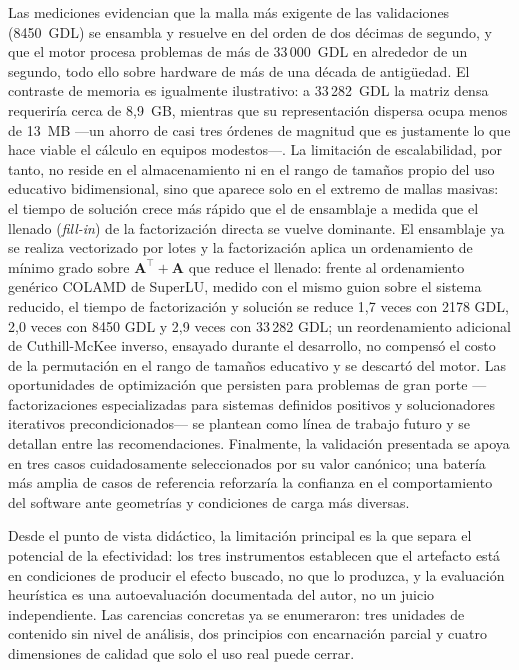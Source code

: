 Las mediciones evidencian que la malla más exigente de las validaciones (8450~GDL) se ensambla y resuelve en del orden de dos décimas de segundo, y que el motor procesa problemas de más de 33\,000~GDL en alrededor de un segundo, todo ello sobre hardware de más de una década de antigüedad. El contraste de memoria es igualmente ilustrativo: a 33\,282~GDL la matriz densa requeriría cerca de 8{,}9~GB, mientras que su representación dispersa ocupa menos de 13~MB ---un ahorro de casi tres órdenes de magnitud que es justamente lo que hace viable el cálculo en equipos modestos---. La limitación de escalabilidad, por tanto, no reside en el almacenamiento ni en el rango de tamaños propio del uso educativo bidimensional, sino que aparece solo en el extremo de mallas masivas: el tiempo de solución crece más rápido que el de ensamblaje a medida que el llenado (\emph{fill-in}) de la factorización directa se vuelve dominante. El ensamblaje ya se realiza vectorizado por lotes y la factorización aplica un ordenamiento de mínimo grado sobre $\bm{A}^{\top}+\bm{A}$ que reduce el llenado: frente al ordenamiento genérico COLAMD de SuperLU, medido con el mismo guion sobre el sistema reducido, el tiempo de factorización y solución se reduce 1,7 veces con 2178 GDL, 2,0 veces con 8450 GDL y 2,9 veces con 33\,282 GDL; un reordenamiento adicional de Cuthill-McKee inverso, ensayado durante el desarrollo, no compensó el costo de la permutación en el rango de tamaños educativo y se descartó del motor. Las oportunidades de optimización que persisten para problemas de gran porte —factorizaciones especializadas para sistemas definidos positivos y solucionadores iterativos precondicionados— se plantean como línea de trabajo futuro y se detallan entre las recomendaciones. Finalmente, la validación presentada se apoya en tres casos cuidadosamente seleccionados por su valor canónico; una batería más amplia de casos de referencia reforzaría la confianza en el comportamiento del software ante geometrías y condiciones de carga más diversas.

Desde el punto de vista didáctico, la limitación principal es la que separa el potencial de la efectividad: los tres instrumentos establecen que el artefacto está en condiciones de producir el efecto buscado, no que lo produzca, y la evaluación heurística es una autoevaluación documentada del autor, no un juicio independiente. Las carencias concretas ya se enumeraron: tres unidades de contenido sin nivel de análisis, dos principios con encarnación parcial y cuatro dimensiones de calidad que solo el uso real puede cerrar.

